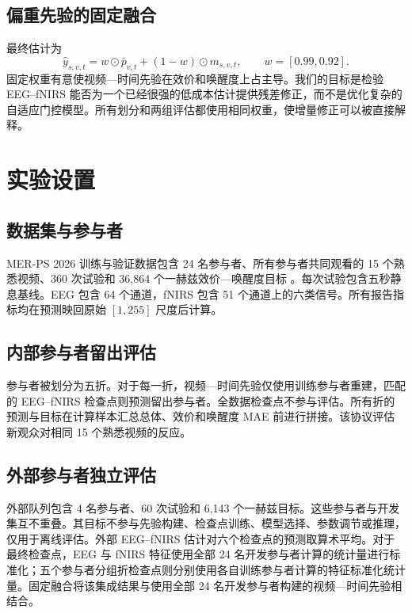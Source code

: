 \subsection{偏重先验的固定融合}

最终估计为
\begin{equation}
 \hat y_{s,v,t}
 = w\odot \bar p_{v,t} + (1-w)\odot m_{s,v,t},
 \qquad w=[0.99,0.92].
\end{equation}
固定权重有意使视频—时间先验在效价和唤醒度上占主导。我们的目标是检验 EEG--fNIRS 能否为一个已经很强的低成本估计提供残差修正，而不是优化复杂的自适应门控模型。所有划分和两组评估都使用相同权重，使增量修正可以被直接解释。

\section{实验设置}
\label{sec:setup}

\subsection{数据集与参与者}

MER-PS 2026 训练与验证数据包含 24 名参与者、所有参与者共同观看的 15 个熟悉视频、360 次试验和 36,864 个一赫兹效价—唤醒度目标
\cite{lian2026mer,merpsdataset}。每次试验包含五秒静息基线。EEG 包含 64 个通道，fNIRS 包含 51 个通道上的六类信号。所有报告指标均在预测映回原始 \([1,255]\) 尺度后计算。

\subsection{内部参与者留出评估}

参与者被划分为五折。对于每一折，视频—时间先验仅使用训练参与者重建，匹配的 EEG--fNIRS 检查点则预测留出参与者。全数据检查点不参与评估。所有折的预测与目标在计算样本汇总总体、效价和唤醒度 MAE 前进行拼接。该协议评估新观众对相同 15 个熟悉视频的反应。

\subsection{外部参与者独立评估}

外部队列包含 4 名参与者、60 次试验和 6,143 个一赫兹目标。这些参与者与开发集互不重叠。其目标不参与先验构建、检查点训练、模型选择、参数调节或推理，仅用于离线评估。外部 EEG--fNIRS 估计对六个检查点的预测取算术平均。对于最终检查点，EEG 与 fNIRS 特征使用全部 24 名开发参与者计算的统计量进行标准化；五个参与者分组折检查点则分别使用各自训练参与者计算的特征标准化统计量。固定融合将该集成结果与使用全部 24 名开发参与者构建的视频—时间先验相结合。

